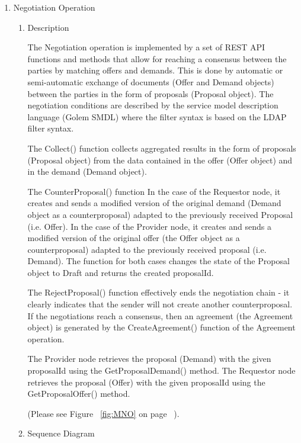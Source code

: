 \begin{enumerate}
\begin{enumerate}
\end{enumerate}


\item  Negotiation Operation

\begin{enumerate}

\item Description

The Negotiation operation is implemented by a set of REST API functions and methods that allow for reaching a consensus between the parties
by matching offers and demands. This is done by automatic or semi-automatic exchange of documents (Offer and Demand objects)
between the parties in the form of proposals (Proposal object). 
The negotiation conditions are described by the service model description language (Golem SMDL) 
where the filter syntax is based on the LDAP filter syntax.

The Collect() function collects aggregated results in the form of proposals (Proposal object) from the data contained 
in the offer (Offer object) and in the demand (Demand object).

The CounterProposal() function In the case of the Requestor node, it creates and sends a modified version of the original demand 
(Demand object as a counterproposal) adapted to the previously received Proposal (i.e. Offer).
In the case of the Provider node, it creates and sends a modified version of the original offer (the Offer object as a counterproposal) 
adapted to the previously received proposal (i.e. Demand). The function for both cases changes the state of the Proposal object to Draft 
and returns the created proposalId. 

The RejectProposal() function effectively ends the negotiation chain - it clearly indicates
that the sender will not create another counterproposal. If the negotiations reach a consensus, 
then an agreement (the Agreement object) is generated by the CreateAgreement() function of the Agreement operation. 

The Provider node retrieves the proposal (Demand) with the given proposalId using the GetProposalDemand() method. 
The Requestor node retrieves the proposal (Offer) with the given proposalId using the GetProposalOffer() method.

(Please see Figure ~\ref{fig:MNO} on page ~\pageref{fig:MNO}).

\break

\item Sequence Diagram


\end{enumerate}
\end{enumerate}
